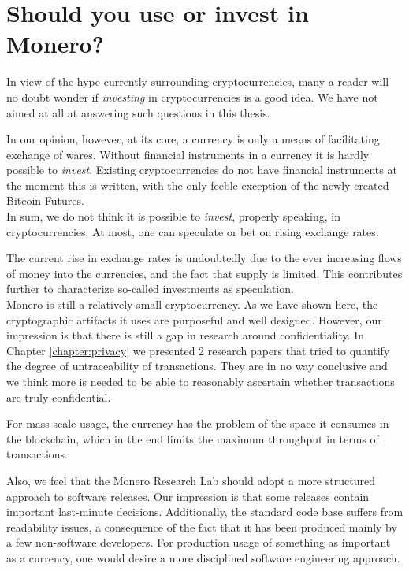 \section{Should you use or invest in Monero?}

In view of the hype currently surrounding cryptocurrencies, many a reader will no doubt wonder if {\em investing} in
cryptocurrencies is a good idea. We have not aimed at all at answering such questions in this thesis.

In our opinion, however, at its core, a currency is only a means of facilitating exchange of wares. Without 
financial instruments
in a currency it is hardly possible to {\em invest}. Existing cryptocurrencies do not have financial instruments
at the moment this is written, with the only feeble exception of the newly created Bitcoin Futures.
\\

In sum, we do not think it is possible to {\em invest}, properly speaking, in cryptocurrencies. 
At most, one can speculate or
bet on rising exchange rates.

The current rise in exchange rates is undoubtedly due to the ever increasing flows of money into the
currencies, and the fact that supply is limited. This contributes further to characterize so-called
investments as speculation.
\\

Monero is still a relatively small cryptocurrency. As we have shown here, the cryptographic artifacts it uses
are purposeful and well designed. However, our impression is that there is still a gap in research
around confidentiality. In Chapter \ref{chapter:privacy} we presented 2 research papers that
tried to quantify the degree of untraceability of transactions. They are in no way conclusive and we think
more is needed to be able to reasonably ascertain whether transactions are truly confidential.

For mass-scale usage, the currency has the problem of the space it consumes in the blockchain, which in the end
limits the maximum throughput in terms of transactions.

Also, we feel that the Monero Research Lab should adopt a more structured approach to software releases.
Our impression is that some releases contain important last-minute decisions. Additionally, the standard
code base suffers from readability issues, a consequence of the fact that it has been produced mainly
by a few non-software developers. For production usage of something as important as a currency,
one would desire a more disciplined software engineering approach.
\\

